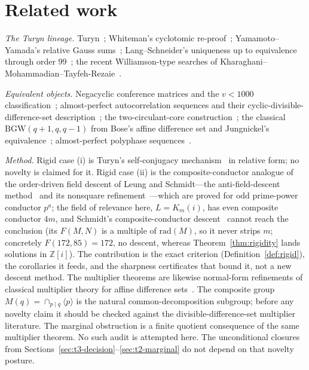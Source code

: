 \documentclass[11pt]{article}
\theoremstyle{plain}
\theoremstyle{definition}
\theoremstyle{remark}
\newcommand{\Z}{\mathbb Z}
\begin{document}
\section{Related work}\label{sec:related}

\emph{The Turyn lineage.} Turyn~\cite{Turyn72}; Whiteman's cyclotomic
re-proof~\cite{Whiteman73}; Yamamoto--Yamada's relative Gauss sums~\cite{YY85};
Lang--Schneider's uniqueness up to equivalence through order $99$~\cite{LS12};
the recent Williamson-type searches of
Kharaghani--Mohammadian--Tayfeh-Rezaie~\cite{KMT26}.

\emph{Equivalent objects.} Negacyclic conference matrices and the $v<1000$
classification~\cite{DGS71,Seberry16}; almost-perfect autocorrelation sequences
and their cyclic-divisible-difference-set description~\cite{Wolfmann92,PB95};
the two-circulant-core construction~\cite{BAOD22}; the classical
$\mathrm{BGW}(q+1,q,q-1)$ from Bose's affine difference set and Jungnickel's
equivalence~\cite{Bose42,Jungnickel82,JK}; almost-perfect polyphase
sequences~\cite{Luke97,Luke01,ZHL05}.

\emph{Method.} Rigid case (i) is Turyn's self-conjugacy mechanism~\cite{Turyn65}
in relative form; no novelty is claimed for it. Rigid case (ii) is the
composite-conductor analogue of the order-driven field descent of Leung and
Schmidt---the anti-field-descent method~\cite[Lemma 4.6, Thm 4.5]{LS16} and its
nonsquare refinement~\cite[Thm 22]{LS19}---which are proved for odd prime-power
conductor $p^a$; the field of relevance here, $L=K_m(i)$, has even composite
conductor $4m$, and Schmidt's composite-conductor descent~\cite{Schmidt99}
cannot reach the conclusion (its $F(M,N)$ is a multiple of $\mathrm{rad}(M)$, so
it never strips $m$; concretely $F(172,85)=172$, no descent, whereas
Theorem~\ref{thm:rigidity} lands solutions in $\Z[i]$). The contribution is the
exact criterion (Definition~\ref{def:rigid}), the corollaries it feeds, and the
sharpness certificates that bound it, not a new descent method. The multiplier
theorems are likewise normal-form refinements of classical multiplier theory for
affine difference sets~\cite{JK}. The composite group
$M(q)=\cap_{p\mid q}\langle p\rangle$ is the natural common-decomposition
subgroup; before any novelty claim it should be checked against the
divisible-difference-set multiplier literature. The marginal obstruction is a
finite quotient consequence of the same multiplier theorem. No such audit is
attempted here. The unconditional closures from
Sections~\ref{sec:t3-decision}--\ref{sec:t2-marginal} do not depend on that
novelty posture.
\end{document}
